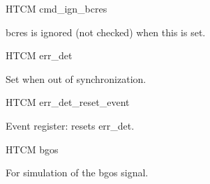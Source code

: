 \begin{register}{H}{TCM cmd\_ign\_bcres}{}%
	\label{cmd_ign_bcres}%
	\regnewline%

	\begin{regdesc}
	\begin{reglist}
 		\item [cmd\_ign\_bcres] bcres is ignored (not checked) when this is set.
	\end{reglist}
	\end{regdesc}
\end{register}

\begin{register}{H}{TCM err\_det}{}%
	\label{err_det}%
	\regfield{err\_det}{1}{0}{0}%
	\regnewline%

	\begin{regdesc}
	\begin{reglist}
		\item [err\_det] Set when out of synchronization.
	\end{reglist}
	\end{regdesc}
\end{register}

\begin{register}{H}{TCM err\_det\_reset\_event}{}%
	\label{err_det_reset_event}%
	\regnewline%

	\begin{regdesc}
	\begin{reglist}
 		\item [err\_det\_reset\_event] Event register: resets err\_det.
	\end{reglist}
	\end{regdesc}
\end{register}

\begin{register}{H}{TCM bgos}{}%
	\label{bgos}%
	\regnewline%

	\begin{regdesc}
	\begin{reglist}
 		\item [bgos] For simulation of the bgos signal.
	\end{reglist}
	\end{regdesc}
\end{register}

